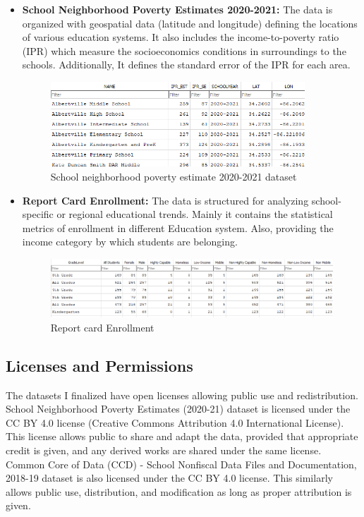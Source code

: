 \documentclass[a4paper,11pt]{article}
\begin{document}
        \begin{itemize}
            \item \textbf{School Neighborhood Poverty Estimates 2020-2021:}
             The data is organized with geospatial data (latitude and longitude) defining the locations of various education systems. It also includes the income-to-poverty ratio (IPR) which measure the socioeconomics conditions in surroundings to the schools. Additionally, It defines the standard error of the IPR for each area.
            \begin{figure}[ht!]
                \centering
                \includegraphics[width=0.9\textwidth]{images/SchoolNeighborhoodPovertyData.png}
                \caption{School neighborhood poverty estimate 2020-2021 dataset}
                \label{fig:dataset1}
            \end{figure}
            
           
            
\newpage
            \item \textbf{Report Card Enrollment:} The data is structured for analyzing school-specific or regional educational trends. Mainly it contains the statistical metrics of enrollment in different Education system. Also, providing the income category by which students are belonging. 
            \begin{figure}[h!]
                \centering
                \includegraphics[width=0.9\linewidth]{images/ReportCardEnrollmentData.png}
                \caption{Report card Enrollment}
                \label{fig:dataset2}
            \end{figure}
        \end{itemize} 

    \subsection{Licenses and Permissions} The datasets I finalized have open licenses allowing public use and redistribution. School Neighborhood Poverty Estimates (2020-21) dataset is licensed under the CC BY 4.0 license (Creative Commons Attribution 4.0 International License). This license allows public to share and adapt the data, provided that appropriate credit is given, and any derived works are shared under the same license.
    Common Core of Data (CCD) - School Nonfiscal Data Files and Documentation, 2018-19 dataset is also licensed under the CC BY 4.0 license. This similarly allows public use, distribution, and modification as long as proper attribution is given.
\end{document}
